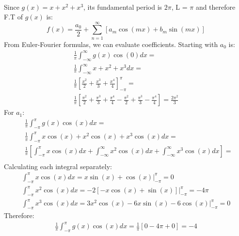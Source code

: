 \documentclass[12pt]{article}
\begin{document}
\subsection{}
Since $g(x) = x + x^2 + x^3$, its fundamental period is $2\pi$, L = $\pi$ and therefore F.T of $g(x)$ is:
\begin{equation}
    f(x) = \frac{a_0}{2} + \sum_{n=1}^{\infty}\left[a_m\cos(mx)+b_m\sin(mx)\right]
\end{equation}
From Euler-Fourier formulas, we can evaluate coefficients. Starting with $a_0$ is:
\begin{equation}
    \begin{gathered}
        \frac{1}{\pi}\int_{-\infty}^{\infty}g(x)\cos(0)dx =\\
        \frac{1}{\pi}\int_{-\infty}^{\infty}x + x^2 + x^3dx =\\ \frac{1}{\pi}\left[\frac{x^2}{2} + \frac{x^3}{3} + \frac{x^4}{4}\right]_{-\pi}^{\pi} =\\ \frac{1}{\pi}\left[\frac{\pi^2}{2} + \frac{\pi^3}{3} + \frac{\pi^4}{4} - \frac{\pi^2}{2} + \frac{\pi^3}{3} - \frac{\pi^4}{4}\right] = \frac{2\pi^2}{3}
    \end{gathered}
\end{equation}
For $a_1$:
\begin{equation}
    \begin{split}
        &\frac{1}{\pi}\int_{-\pi}^{\pi}g(x)\cos(x)dx =\\
        &\frac{1}{\pi}\int_{-\pi}^{\pi}x\cos(x) + x^2\cos(x) + x^3\cos(x)dx =\\
        &\frac{1}{\pi}\left[\int_{-\pi}^{\pi}x\cos(x)dx + \int_{-\infty}^{\infty}x^2\cos(x)dx + \int_{-\infty}^{\infty}x^3\cos(x)dx\right] =\\
    \end{split}
\end{equation}
Calculating each integral separately:
\begin{equation}
    \begin{gathered}
        \int_{-\pi}^{\pi}x\cos(x)dx = x\sin(x) + \cos(x)\bigg|_{-\pi}^{\pi} = 0\\
        \int_{-\pi}^{\pi}x^2\cos(x)dx = -2[-x\cos(x)+\sin(x)]\bigg|_{-\pi}^{\pi} = -4\pi\\ 
        \int_{-\pi}^{\pi}x^3\cos(x)dx = 3x^2\cos(x) - 6x\sin(x) - 6\cos(x)\bigg|_{-\pi}^{\pi} = 0
    \end{gathered}
\end{equation}
Therefore:
\begin{equation}
    \begin{gathered}
        \frac{1}{\pi}\int_{-\pi}^{\pi}g(x)\cos(x)dx = \frac{1}{\pi}\left[0-4\pi+0\right] = -4
    \end{gathered}
\end{equation}
\end{document}
